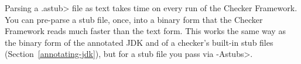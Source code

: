 %
%
%
%
%
%
%
%
%
%
%
%
%



Parsing a \<.astub> file as text takes time on every run of the Checker
Framework.  You can pre-parse a stub file, once, into a binary form that the
Checker Framework reads much faster than the text form.  This works the same
way as the binary form of the annotated JDK and of a checker's built-in stub
files (Section~\ref{annotating-jdk}), but for a stub file you pass via
\<-Astubs>.

